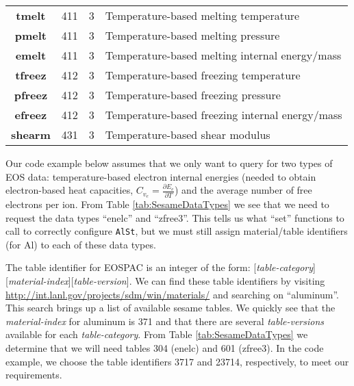 \documentclass[11pt]{nmemo}
\begin{document}
\begin{table}[!ht]
\begin{center}
\begin{tabularx}{0.9\linewidth}{CDDL}
            
            \textbf{tmelt} & 411 & 3 & Temperature-based melting temperature\\
            \textbf{pmelt} & 411 & 3 & Temperature-based melting pressure\\
            \textbf{emelt} & 411 & 3 & Temperature-based melting internal energy/mass\\
            
            
            \textbf{tfreez} & 412 & 3 & Temperature-based freezing temperature\\
            \textbf{pfreez} & 412 & 3 & Temperature-based freezing pressure\\
            \textbf{efreez} & 412 & 3 & Temperature-based freezing internal energy/mass\\
            
            
            \textbf{shearm} & 431 & 3 & Temperature-based shear modulus\\

    \end{tabularx}
  \end{center}
  \normalsize
\end{table}

Our code example below assumes that we only want to query for two
types of EOS data: temperature-based electron internal energies
(needed to obtain electron-based heat capacities, $C_{v_e} =
\frac{\partial E_e} {\partial T}$) and the average number of free
electrons per ion.  From Table \ref{tab:SesameDataTypes} we see that
we need to request the data types ``enelc'' and ``zfree3''.  This
tells us what ``set'' functions to call to correctly configure
\texttt{AlSt}, but we must still assign material/table identifiers
(for Al) to each of these data types.

The table identifier for EOSPAC is an integer of the form:
[\emph{table-category}][\emph{material-index}][\emph{table-version}].
We can find these table identifiers by visiting
\url{http://int.lanl.gov/projects/sdm/win/materials/} and searching on
``aluminum''.  This search brings up a list of available sesame
tables.  We quickly see that the \emph{material-index} for aluminum is
371 and that there are several \emph{table-versions} available for
each \emph{table-category}. From Table \ref{tab:SesameDataTypes} we
determine that we will need tables 304 (enelc) and 601 (zfree3).  In
the code example, we choose the table identifiers 3717 and 23714,
respectively, to meet our requirements.
\end{document}
